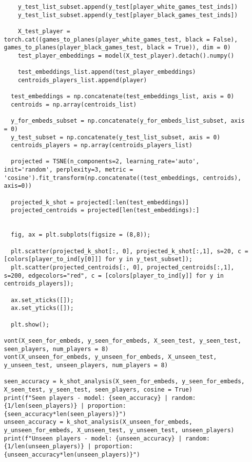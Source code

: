\begin{verbatim}
    y_test_list_subset.append(y_test[player_white_games_test_inds])
    y_test_list_subset.append(y_test[player_black_games_test_inds])

    X_test_player = torch.cat((games_to_planes(player_white_games_test, black = False), games_to_planes(player_black_games_test, black = True)), dim = 0)
    test_player_embeddings = model(X_test_player).detach().numpy()

    test_embeddings_list.append(test_player_embeddings)
    centroids_players_list.append(player)

  test_embeddings = np.concatenate(test_embeddings_list, axis = 0)
  centroids = np.array(centroids_list) 

  y_for_embeds_subset = np.concatenate(y_for_embeds_list_subset, axis = 0)
  y_test_subset = np.concatenate(y_test_list_subset, axis = 0)
  centroids_players = np.array(centroids_players_list)

  projected = TSNE(n_components=2, learning_rate='auto', init='random', perplexity=3, metric = 'cosine').fit_transform(np.concatenate((test_embeddings, centroids), axis=0))

  projected_k_shot = projected[:len(test_embeddings)]
  projected_centroids = projected[len(test_embeddings):]


  fig, ax = plt.subplots(figsize = (8,8));

  plt.scatter(projected_k_shot[:, 0], projected_k_shot[:,1], s=20, c = [colors[player_to_ind[y[0]]] for y in y_test_subset]);
  plt.scatter(projected_centroids[:, 0], projected_centroids[:,1], s=200, edgecolors="red", c = [colors[player_to_ind[y]] for y in centroids_players]);
  
  ax.set_xticks([]);
  ax.set_yticks([]);

  plt.show();

vont(X_seen_for_embeds, y_seen_for_embeds, X_seen_test, y_seen_test, seen_players, num_players = 8)
vont(X_unseen_for_embeds, y_unseen_for_embeds, X_unseen_test, y_unseen_test, unseen_players, num_players = 8)

seen_accuracy = k_shot_analysis(X_seen_for_embeds, y_seen_for_embeds, X_seen_test, y_seen_test, seen_players, cosine = True)
print(f"Seen players - model: {seen_accuracy} | random: {1/len(seen_players)} | proportion: {seen_accuracy*len(seen_players)}")
unseen_accuracy = k_shot_analysis(X_unseen_for_embeds, y_unseen_for_embeds, X_unseen_test, y_unseen_test, unseen_players)
print(f"Unseen players - model: {unseen_accuracy} | random: {1/len(unseen_players)} | proportion: {unseen_accuracy*len(unseen_players)}")
\end{verbatim}
